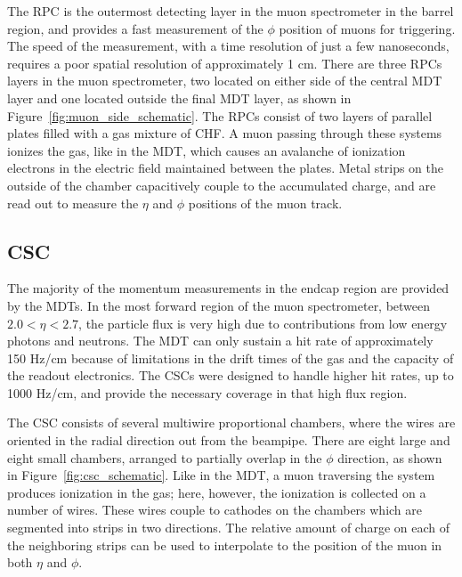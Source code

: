The \ac{RPC} is the outermost detecting layer in the muon spectrometer in the barrel region, and provides a fast measurement of the $\phi$ position of muons for triggering.
The speed of the measurement, with a time resolution of just a few nanoseconds, requires a poor spatial resolution of approximately 1 cm. 
There are three \acp{RPC} layers in the muon spectrometer, two located on either side of the central \ac{MDT} layer and one located outside the final \ac{MDT} layer, as shown in Figure~\ref{fig:muon_side_schematic}.
The \acp{RPC} consist of two layers of parallel plates filled with a gas mixture of CHF.
A muon passing through these systems ionizes the gas, like in the \ac{MDT}, which causes an avalanche of ionization electrons in the electric field maintained between the plates.
Metal strips on the outside of the chamber capacitively couple to the accumulated charge, and are read out to measure the $\eta$ and $\phi$ positions of the muon track. 

\subsection{\acl{CSC}}
The majority of the momentum measurements in the endcap region are provided by the \acp{MDT}.
In the most forward region of the muon spectrometer, between $2.0 < \eta < 2.7$, the particle flux is very high due to contributions from low energy photons and neutrons.
The \ac{MDT} can only sustain a hit rate of approximately 150 Hz/cm because of limitations in the drift times of the gas and the capacity of the readout electronics. 
The \acp{CSC} were designed to handle higher hit rates, up to 1000 Hz/cm, and provide the necessary coverage in that high flux region.

The \ac{CSC} consists of several multiwire proportional chambers, where the wires are oriented in the radial direction out from the beampipe.
There are eight large and eight small chambers, arranged to partially overlap in the $\phi$ direction, as shown in Figure~\ref{fig:csc_schematic}.
Like in the \ac{MDT}, a muon traversing the system produces ionization in the gas; here, however, the ionization is collected on a number of wires.
These wires couple to cathodes on the chambers which are segmented into strips in two directions.
The relative amount of charge on each of the neighboring strips can be used to interpolate to the position of the muon in both $\eta$ and $\phi$. 


